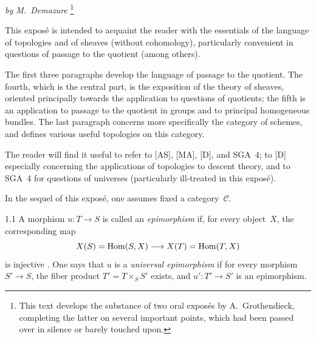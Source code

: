 \label{IV}

\begin{center}
\textit{by M.~Demazure}%
{\renewcommand{\thefootnote}{(*)}\footnote{This text develops the substance
of two oral expos\'es by A.~Grothendieck, completing the latter on several
important points, which had been passed over in silence or barely touched
upon.}}
\end{center}

{\renewcommand{\thefootnote}{(0)}}%
This expos\'e is intended to acquaint the reader with the essentials of the
language of topologies and of sheaves (without cohomology), particularly
convenient in questions of passage to the quotient (among others).

The first three paragraphs develop the language of passage to the quotient.
The fourth, which is the central part, is the exposition of the theory of
sheaves, oriented principally towards the application to questions of
quotients; the fifth is an application to passage to the quotient in groups
and to principal homogeneous bundles. The last paragraph concerns more
specifically the category of schemes, and defines various useful topologies
on this category.

The reader will find it useful to refer to \textup{[AS]}, \textup{[MA]},
\textup{[D]}, and SGA~4; to \textup{[D]} especially concerning the
applications of topologies to descent theory, and to SGA~4 for questions of
universes (particularly ill-treated in this expos\'e).

\label{IV.sec.1}

In the sequel of this expos\'e, one assumes fixed a category~\(\mathcal{C}\).

\begin{definition}{1.1}
\label{IV.1.1}
A morphism \(u\colon T\to S\) is called an \emph{epimorphism} if, for every
object~\(X\), the corresponding map
\[
X(S)=\operatorname{Hom}(S,X)\longrightarrow X(T)=\operatorname{Hom}(T,X)
\]
is injective%
{\renewcommand{\thefootnote}{(1)}}.
One says that \(u\) is a \emph{universal epimorphism} if for every morphism
\(S'\to S\), the fiber product \(T'=T\times_{S}S'\) exists, and
\(u'\colon T'\to S'\) is an epimorphism.
\end{definition}


